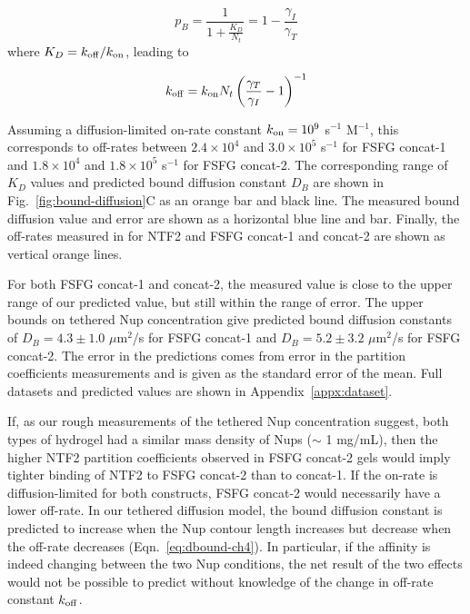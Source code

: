 \begin{equation}
p_B  = \frac{1}{1+\frac{K_D}{N_t}} = 1 - \frac{\gamma_I}{\gamma_T}
\label{eq:koff-Nt-1}
\end{equation} where $K_D = k_{\rm off}/k_{\rm on}$, leading to

\begin{equation}
k_{\rm off} = k_{\rm on} N_t \left(\frac{\gamma_T}{\gamma_I}-1\right)^{-1}
\label{eq:koff-Nt-2}
\end{equation}

Assuming a diffusion-limited on-rate constant $k_{\rm on} = 10^9$ s$^{-1}$ M$^{-1}$, this corresponds to off-rates between $2.4\times 10^4$ and $3.0 \times 10^5$ s$^{-1}$ for FSFG concat-1 and $1.8\times 10^4$ and $1.8 \times 10^5$ s$^{-1}$ for FSFG concat-2.  The corresponding range of $K_D$ values and predicted bound diffusion constant $D_B$ are shown in Fig.~\ref{fig:bound-diffusion}C as an orange bar and black line.  The measured bound diffusion value and error are shown as a horizontal blue line and bar.  Finally, the off-rates measured in \cite{hayama18} for NTF2 and FSFG concat-1 and concat-2 are shown as vertical orange lines.  

For both FSFG concat-1 and concat-2, the measured value is close to the upper range of our predicted value, but still within the range of error.  The upper bounds on tethered Nup concentration give predicted bound diffusion constants of $D_B = 4.3\pm1.0$ $\mu$m$^2$/s for FSFG concat-1 and $D_B = 5.2\pm3.2$ $\mu$m$^2$/s for FSFG concat-2.  The error in the predictions comes from error in the partition coefficients measurements and is given as the standard error of the mean. Full datasets and predicted values are shown in Appendix~\ref{appx:dataset}.

If, as our rough measurements of the tethered Nup concentration suggest, both types of hydrogel had a similar mass density of Nups ($\sim$ 1 mg/mL), then the higher NTF2 partition coefficients observed in FSFG concat-2 gels would imply tighter binding of NTF2 to FSFG concat-2 than to concat-1.  If the on-rate is diffusion-limited for both constructs, FSFG concat-2 would necessarily have a lower off-rate.  In our tethered diffusion model, the bound diffusion constant is predicted to increase when the Nup contour length increases but decrease when the off-rate decreases (Eqn.~\ref{eq:dbound-ch4}).  In particular, if the affinity is indeed changing between the two Nup conditions, the net result of the two effects would not be possible to predict without knowledge of the change in off-rate constant $k_{\rm off}$.

